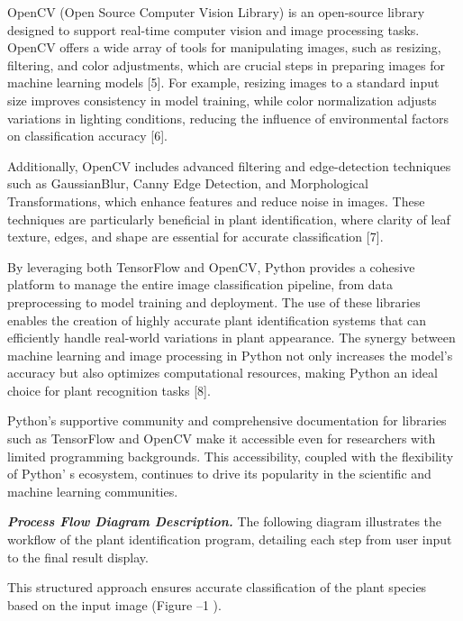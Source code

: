 {{OpenCV (Open Source Computer Vision Library) is an open-source library
designed to support real-time computer vision and image processing
tasks. OpenCV offers a wide array of tools for manipulating images, such
as resizing, filtering, and color adjustments, which are crucial steps
in preparing images for machine learning models {[}5{]}. For example,
resizing images to a standard input size improves consistency in model
training, while color normalization adjusts variations in lighting
conditions, reducing the influence of environmental factors on
classification accuracy {[}6{]}.

Additionally, OpenCV includes advanced filtering and edge-detection
techniques such as GaussianBlur, Canny Edge Detection, and Morphological
Transformations, which enhance features and reduce noise in images.
These techniques are particularly beneficial in plant identification,
where clarity of leaf texture, edges, and shape are essential for
accurate classification {[}7{]}.

By leveraging both TensorFlow and OpenCV, Python provides a cohesive
platform to manage the entire image classification pipeline, from data
preprocessing to model training and deployment. The use of these
libraries enables the creation of highly accurate plant identification
systems that can efficiently handle real-world variations in plant
appearance. The synergy between machine learning and image processing in
Python not only increases the model's accuracy but also optimizes
computational resources, making Python an ideal choice for plant
recognition tasks {[}8{]}.

Python's supportive community and comprehensive documentation for
libraries such as TensorFlow and OpenCV make it accessible even for
researchers with limited programming backgrounds. This accessibility,
coupled with the flexibility of Python' s ecosystem,
continues to drive its popularity in the scientific and machine learning
communities.

\emph{{\bfseries Process Flow Diagram Description.}} The following diagram
illustrates the workflow of the plant identification program, detailing
each step from user input to the final result display.

This structured approach ensures accurate classification of the plant
species based on the input image (Figure --1 ).

}}
